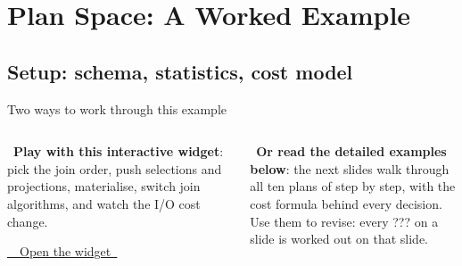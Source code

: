 \section{Plan Space: A Worked Example}

\subsection{Setup: schema, statistics, cost model}

\begin{frame}{Two ways to work through this example}
  \begin{columns}[T]
      \begin{keybox}[In class]
        \faMousePointer\ \textbf{Play with this interactive widget}: pick the join order, push selections and
        projections, materialise, switch join algorithms, and watch the I/O cost change.\par\vspace{2mm}
        {\centering
        \href{\LfifteenWidgetURL}{\colorbox{vinuRed}{\color{white}\vinuHeadFontSB\small\ \faExternalLink*\ Open the widget\ }}\par
        \vspace{1mm}{\tiny\color{vinuGray}\expandafter\url\expandafter{\LfifteenWidgetURL}}\par}
      \end{keybox}
      \begin{extrabox}
        \faBookOpen\ \textbf{Or read the detailed examples below}: the next slides walk through all ten plans of
         step by step, with the cost formula behind every decision.\\[2mm]
        Use them to revise: every \textcolor{vinuRed}{???} on a slide is worked out on that slide.
      \end{extrabox}
  \end{columns}
\end{frame}

